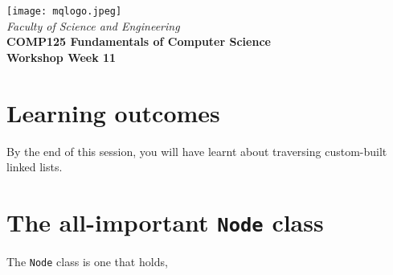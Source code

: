 \usepackage[T1]{fontenc}
\usepackage{tikz}
\usepackage{pslatex}



\usepackage[colorlinks=true,urlcolor=red]{hyperref}
\setlength{\topmargin}{-0.5in}                  %
\setlength{\textheight}{9.5in}                  %
\setlength{\oddsidemargin}{0in}                 %
\setlength{\evensidemargin}{0in}                %
\setlength{\textwidth}{6.5in}                   %
\setlength{\parindent}{0.0in}
\newcommand{\code}{\texttt}






%
\vspace{0.2in}
\begin{center}
        {\large  %
\texttt{[image: mqlogo.jpeg]}\\
\medskip
        {\it  Faculty of Science and Engineering\\}
        \vspace{0.2in}
         {\bf COMP125 Fundamentals of Computer Science\\
        Workshop Week 11\\}}
\end{center}
\vspace{0.3in}
%

\renewcommand{\labelenumi}{\alph{enumi}.}
 
\section* {Learning outcomes}

By the end of this session, you will have learnt about traversing custom-built linked lists. 

\section*{The all-important \texttt{Node} class}
The \texttt{Node} class is one that holds,

